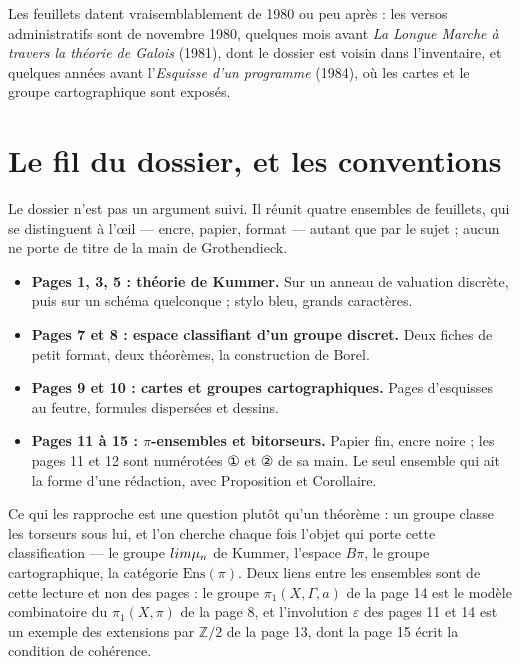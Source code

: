 \documentclass[11pt,a4paper]{article}
\begin{document}
\begin{resume}
Les feuillets datent vraisemblablement de 1980 ou peu après : les versos
administratifs sont de novembre 1980, quelques mois avant \emph{La Longue
Marche à travers la théorie de Galois} (1981), dont le dossier est voisin dans
l'inventaire, et quelques années avant l'\emph{Esquisse d'un programme} (1984),
où les cartes et le groupe cartographique sont exposés.

\end{resume}

\section*{Le fil du dossier, et les conventions}

Le dossier n'est pas un argument suivi. Il réunit quatre ensembles de
feuillets, qui se distinguent à l'œil — encre, papier, format — autant que par
le sujet ; aucun ne porte de titre de la main de Grothendieck.

\begin{itemize}
  \item \textbf{Pages 1, 3, 5 : théorie de Kummer.} Sur un anneau de
    valuation discrète, puis sur un schéma quelconque ; stylo bleu, grands
    caractères.
  \item \textbf{Pages 7 et 8 : espace classifiant d'un groupe discret.} Deux
    fiches de petit format, deux théorèmes, la construction de Borel.
  \item \textbf{Pages 9 et 10 : cartes et groupes cartographiques.} Pages
    d'esquisses au feutre, formules dispersées et dessins.
  \item \textbf{Pages 11 à 15 : $\pi$-ensembles et bitorseurs.} Papier fin,
    encre noire ; les pages 11 et 12 sont numérotées ① et ② de sa main. Le
    seul ensemble qui ait la forme d'une rédaction, avec Proposition et
    Corollaire.
\end{itemize}

Ce qui les rapproche est une question plutôt qu'un théorème : un groupe
classe les torseurs sous lui, et l'on cherche chaque fois l'objet qui porte
cette classification — le groupe $\varprojlim \mu_n$ de Kummer, l'espace $B\pi$,
le groupe cartographique, la catégorie $\mathrm{Ens}(\pi)$. Deux liens entre
les ensembles sont de cette lecture et non des pages : le groupe
$\pi_1(X, \Gamma, a)$ de la page 14 est le modèle combinatoire du
$\pi_1(X, \pi)$ de la page 8, et l'involution $\varepsilon$ des pages 11 et 14
est un exemple des extensions par $\mathbb{Z}/2$ de la page 13, dont la page 15
écrit la condition de cohérence.
\end{document}
